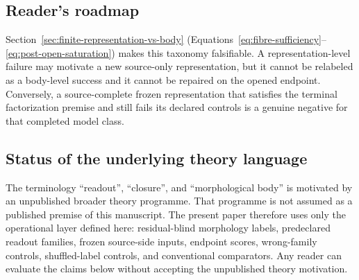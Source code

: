 \documentclass[11pt]{article}
\begin{document}
\subsection{Reader's roadmap}

\noindent{}

Section~\ref{sec:finite-representation-vs-body}
(Equations~\eqref{eq:fibre-sufficiency}--\eqref{eq:post-open-saturation}) makes
this taxonomy falsifiable.  A representation-level failure may motivate a
new source-only representation, but it cannot be relabeled as a body-level
success and it cannot be repaired on the opened endpoint.  Conversely, a
source-complete frozen representation that satisfies the terminal
factorization premise and still fails its declared controls is a genuine
negative for that completed model class.

\subsection{Status of the underlying theory language}

The terminology ``readout'', ``closure'', and ``morphological body'' is motivated
by an unpublished broader theory programme.  That programme is not assumed as a
published premise of this manuscript.  The present paper therefore uses only
the operational layer defined here: residual-blind morphology labels,
predeclared readout families, frozen source-side inputs, endpoint scores,
wrong-family controls, shuffled-label controls, and conventional comparators.
Any reader can evaluate the claims below without accepting the unpublished
theory motivation.
\end{document}
